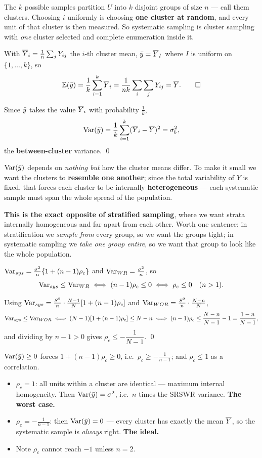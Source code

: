  The $k$ possible samples partition $U$ into $k$ disjoint groups of size $n$ --- call them
clusters. Choosing $i$ uniformly is choosing \textbf{one cluster at random}, and every unit of
that cluster is then measured. So systematic sampling is cluster sampling with \emph{one} cluster
selected and complete enumeration inside it.

 With $\overline{Y}_i=\frac1n\sum_jY_{ij}$ the $i$-th cluster mean, $\bar{y}=\overline{Y}_I$ where $I$ is
uniform on $\{1,\dots,k\}$, so
\[
  \mathbb{E}(\bar{y})=\frac1k\sum_{i=1}^k\overline{Y}_i=\frac{1}{nk}\sum_i\sum_jY_{ij}=\overline{Y} . \qquad\square
\]

 Since $\bar{y}$ takes the value $\overline{Y}_i$ with probability $\frac1k$,
\[
  \operatorname{Var}(\bar{y})=\frac1k\sum_{i=1}^k(\overline{Y}_i-\overline{Y})^2=\sigma_b^2 ,
\]
the \textbf{between-cluster} variance. \qed

 $\operatorname{Var}(\bar{y})$ depends on \emph{nothing but} how the cluster means differ. To make it small
we want the clusters to \textbf{resemble one another}; since the total variability of $Y$ is
fixed, that forces each cluster to be internally \textbf{heterogeneous} --- each systematic sample
must span the whole spread of the population.

\textbf{This is the exact opposite of stratified sampling}, where we want strata internally
homogeneous and far apart from each other. Worth one sentence: in stratification we \emph{sample
from} every group, so we want the groups tight; in systematic sampling we \emph{take one group
entire}, so we want that group to look like the whole population.

 $\operatorname{Var}_{sys}=\frac{\sigma^2}{n}\{1+(n-1)\rho_c\}$ and $\operatorname{Var}_{WR}=\frac{\sigma^2}{n}$, so
\[
  \operatorname{Var}_{sys}\le\operatorname{Var}_{WR}\iff(n-1)\rho_c\le0\iff\rho_c\le0\quad(n>1).
\]

 Using $\operatorname{Var}_{sys}=\frac{S^2}{n}\cdot\frac{N-1}{N}[1+(n-1)\rho_c]$ and
$\operatorname{Var}_{WOR}=\frac{S^2}{n}\cdot\frac{N-n}{N}$,
\[
  \operatorname{Var}_{sys}\le\operatorname{Var}_{WOR}\iff(N-1)[1+(n-1)\rho_c]\le N-n
  \iff(n-1)\rho_c\le\frac{N-n}{N-1}-1=\frac{1-n}{N-1},
\]
and dividing by $n-1>0$ gives $\rho_c\le-\dfrac{1}{N-1}$. \qed

 $\operatorname{Var}(\bar{y})\ge0$ forces $1+(n-1)\rho_c\ge0$, i.e.\ $\rho_c\ge-\frac1{n-1}$; and
$\rho_c\le1$ as a correlation.
\begin{itemize}
  \item $\rho_c=1$: all units within a cluster are identical --- maximum internal homogeneity.
        Then $\operatorname{Var}(\bar{y})=\sigma^2$, i.e.\ $n$ times the SRSWR variance. \textbf{The worst case.}
  \item $\rho_c=-\frac1{n-1}$: then $\operatorname{Var}(\bar{y})=0$ --- every cluster has exactly the mean
        $\overline{Y}$, so the systematic sample is \emph{always} right. \textbf{The ideal.}
  \item Note $\rho_c$ cannot reach $-1$ unless $n=2$.
\end{itemize}

